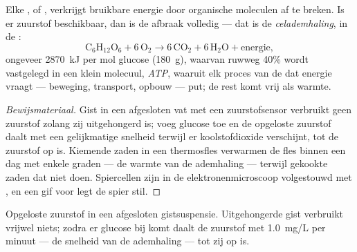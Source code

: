 \begin{proposition}[Celademhaling]\label{prop:g10:cell-metabolism:respiration}
Elke ,  of , verkrijgt bruikbare energie door
organische moleculen af te breken. Is er zuurstof beschikbaar, dan is de
afbraak volledig --- dat is de \emph{celademhaling},
in de :
\[
\mathrm{C_6H_{12}O_6} + 6\,\mathrm{O_2} \longrightarrow
6\,\mathrm{CO_2} + 6\,\mathrm{H_2O} + \text{energie},
\]
ongeveer \qty{2870}{kJ} per mol glucose (\qty{180}{g}), waarvan ruwweg
40\% wordt vastgelegd in een klein molecuul, \emph{ATP},
waaruit elk proces van de  dat energie vraagt --- beweging,
transport, opbouw --- put; de rest komt vrij als warmte.
\end{proposition}
\begin{proof}[Bewijsmateriaal]
Gist in een afgesloten vat met een zuurstofsensor verbruikt geen
zuurstof zolang zij uitgehongerd is; voeg glucose toe en de opgeloste
zuurstof daalt met een gelijkmatige snelheid terwijl er koolstofdioxide
verschijnt, tot de zuurstof op is. Kiemende zaden in een thermosfles
verwarmen de fles binnen een dag met enkele graden --- de warmte van de
ademhaling --- terwijl gekookte zaden dat niet doen. Spiercellen zijn in
de elektronenmicroscoop volgestouwd met , en een gif voor
 legt de spier stil.
\end{proof}

\begin{omfigure}

{\small Opgeloste zuurstof in een afgesloten gistsuspensie. Uitgehongerde
gist verbruikt vrijwel niets; zodra er glucose bij komt daalt de
zuurstof met \qty{1.0}{mg/L} per minuut --- de snelheid van de
ademhaling --- tot zij op is.}
\end{omfigure}

